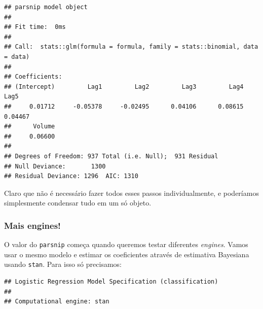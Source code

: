 \documentclass[
]{article}
\newenvironment{Shaded}{\begin{snugshade}}{\end{snugshade}}
\newcommand{\DataTypeTok}[1]{\textcolor[rgb]{0.13,0.29,0.53}{#1}}
\newcommand{\KeywordTok}[1]{\textcolor[rgb]{0.13,0.29,0.53}{\textbf{#1}}}
\newcommand{\NormalTok}[1]{#1}
\newcommand{\OperatorTok}[1]{\textcolor[rgb]{0.81,0.36,0.00}{\textbf{#1}}}
\newcommand{\StringTok}[1]{\textcolor[rgb]{0.31,0.60,0.02}{#1}}
\begin{document}
\begin{verbatim}
## parsnip model object
## 
## Fit time:  0ms 
## 
## Call:  stats::glm(formula = formula, family = stats::binomial, data = data)
## 
## Coefficients:
## (Intercept)         Lag1         Lag2         Lag3         Lag4         Lag5  
##     0.01712     -0.05378     -0.02495      0.04106      0.08615      0.04467  
##      Volume  
##     0.06600  
## 
## Degrees of Freedom: 937 Total (i.e. Null);  931 Residual
## Null Deviance:       1300 
## Residual Deviance: 1296  AIC: 1310
\end{verbatim}

Claro que não é necessário fazer todos esses passos individualmente, e
poderíamos simplesmente condensar tudo em um só objeto.

\begin{Shaded}
\end{Shaded}

\hypertarget{mais-engines}{%
\subsubsection{Mais engines!}\label{mais-engines}}

O valor do \texttt{parsnip} começa quando queremos testar diferentes
\emph{engines}. Vamos usar o mesmo modelo e estimar os coeficientes
através de estimativa Bayesiana usando \texttt{stan}. Para isso só
precisamos:

\begin{Shaded}
\end{Shaded}

\begin{verbatim}
## Logistic Regression Model Specification (classification)
## 
## Computational engine: stan
\end{verbatim}
\end{document}
